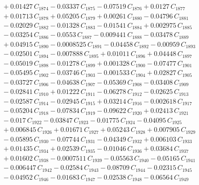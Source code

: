 \documentclass[a4paper,11pt]{article}
\begin{document}
\begin{align}
&\quad + 0.01427\,C_{1874} - 0.03337\,C_{1875} - 0.07519\,C_{1876} + 0.0127\,C_{1877} \nonumber\\
&\quad + 0.01713\,C_{1878} + 0.05205\,C_{1879} + 0.00261\,C_{1880} - 0.04796\,C_{1881} \nonumber\\
&\quad - 0.02029\,C_{1882} - 0.01328\,C_{1883} - 0.01541\,C_{1884} + 0.002975\,C_{1885} \nonumber\\
&\quad - 0.03254\,C_{1886} - 0.0553\,C_{1887} - 0.009441\,C_{1888} - 0.03478\,C_{1889} \nonumber\\
&\quad + 0.04915\,C_{1890} - 0.0008525\,C_{1891} - 0.04458\,C_{1892} - 0.00959\,C_{1893} \nonumber\\
&\quad - 0.02501\,C_{1894} - 0.007888\,C_{1895} + 0.01011\,C_{1896} + 0.04448\,C_{1897} \nonumber\\
&\quad - 0.05019\,C_{1898} - 0.01278\,C_{1899} + 0.001328\,C_{1900} - 0.07477\,C_{1901} \nonumber\\
&\quad - 0.05495\,C_{1902} - 0.03746\,C_{1903} - 0.001533\,C_{1904} + 0.02827\,C_{1905} \nonumber\\
&\quad - 0.03727\,C_{1906} - 0.04638\,C_{1907} - 0.05369\,C_{1908} - 0.03408\,C_{1909} \nonumber\\
&\quad - 0.02841\,C_{1910} + 0.01222\,C_{1911} - 0.06278\,C_{1912} - 0.02625\,C_{1913} \nonumber\\
&\quad - 0.02587\,C_{1914} - 0.02945\,C_{1915} + 0.03214\,C_{1916} - 0.002618\,C_{1917} \nonumber\\
&\quad - 0.05204\,C_{1918} - 0.07834\,C_{1919} - 0.09622\,C_{1920} + 0.02413\,C_{1921} \nonumber\\
&\quad - 0.017\,C_{1922} - 0.03847\,C_{1923} - 0.01775\,C_{1924} - 0.04095\,C_{1925} \nonumber\\
&\quad + 0.006845\,C_{1926} + 0.01671\,C_{1927} + 0.05243\,C_{1928} + 0.007905\,C_{1929} \nonumber\\
&\quad - 0.05895\,C_{1930} - 0.07744\,C_{1931} - 0.04349\,C_{1932} + 0.006103\,C_{1933} \nonumber\\
&\quad + 0.01435\,C_{1934} + 0.02539\,C_{1935} - 0.01046\,C_{1936} + 0.03684\,C_{1937} \nonumber\\
&\quad + 0.01602\,C_{1938} - 0.0007511\,C_{1939} - 0.05563\,C_{1940} - 0.05165\,C_{1941} \nonumber\\
&\quad - 0.006447\,C_{1942} - 0.02584\,C_{1943} - 0.08709\,C_{1944} - 0.02315\,C_{1945} \nonumber\\
&\quad - 0.04952\,C_{1946} - 0.01683\,C_{1947} - 0.02538\,C_{1948} - 0.06564\,C_{1949} \nonumber\\

\end{align}
\end{document}
